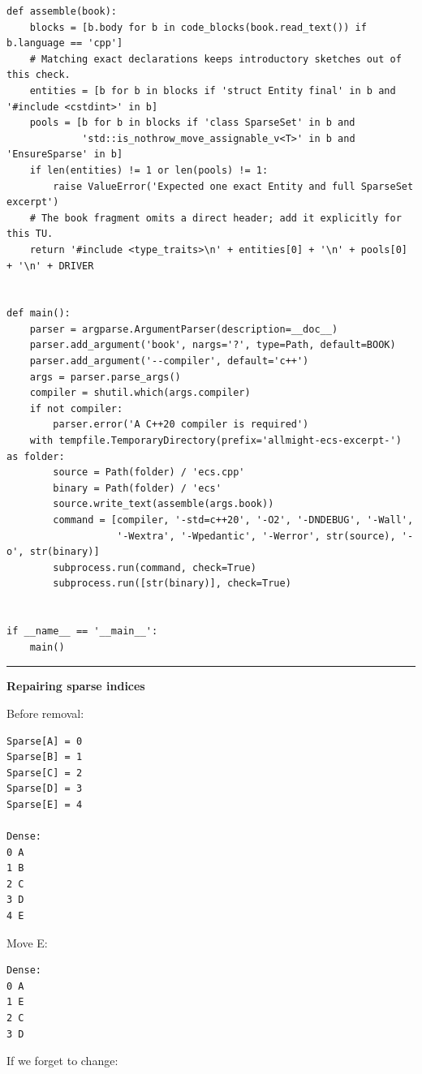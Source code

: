 \begin{verbatim}
def assemble(book):
    blocks = [b.body for b in code_blocks(book.read_text()) if b.language == 'cpp']
    # Matching exact declarations keeps introductory sketches out of this check.
    entities = [b for b in blocks if 'struct Entity final' in b and '#include <cstdint>' in b]
    pools = [b for b in blocks if 'class SparseSet' in b and
             'std::is_nothrow_move_assignable_v<T>' in b and 'EnsureSparse' in b]
    if len(entities) != 1 or len(pools) != 1:
        raise ValueError('Expected one exact Entity and full SparseSet excerpt')
    # The book fragment omits a direct header; add it explicitly for this TU.
    return '#include <type_traits>\n' + entities[0] + '\n' + pools[0] + '\n' + DRIVER


def main():
    parser = argparse.ArgumentParser(description=__doc__)
    parser.add_argument('book', nargs='?', type=Path, default=BOOK)
    parser.add_argument('--compiler', default='c++')
    args = parser.parse_args()
    compiler = shutil.which(args.compiler)
    if not compiler:
        parser.error('A C++20 compiler is required')
    with tempfile.TemporaryDirectory(prefix='allmight-ecs-excerpt-') as folder:
        source = Path(folder) / 'ecs.cpp'
        binary = Path(folder) / 'ecs'
        source.write_text(assemble(args.book))
        command = [compiler, '-std=c++20', '-O2', '-DNDEBUG', '-Wall',
                   '-Wextra', '-Wpedantic', '-Werror', str(source), '-o', str(binary)]
        subprocess.run(command, check=True)
        subprocess.run([str(binary)], check=True)


if __name__ == '__main__':
    main()
\end{verbatim}

\begin{center}\rule{0.5\linewidth}{0.5pt}\end{center}

\textbf{Repairing sparse indices}

Before removal:

\begin{verbatim}
Sparse[A] = 0
Sparse[B] = 1
Sparse[C] = 2
Sparse[D] = 3
Sparse[E] = 4

Dense:
0 A
1 B
2 C
3 D
4 E
\end{verbatim}

Move E:

\begin{verbatim}
Dense:
0 A
1 E
2 C
3 D
\end{verbatim}

If we forget to change:

